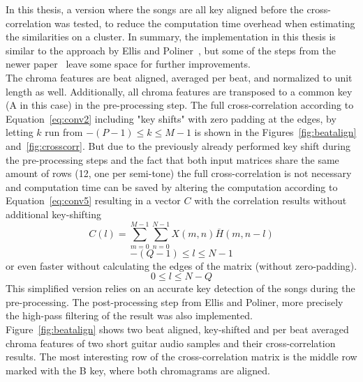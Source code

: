 In this thesis, a version where the songs are all key aligned before the cross-correlation was tested, to reduce the computation time overhead when estimating the similarities on a cluster. 
In summary, the implementation in this thesis is similar to the approach by Ellis and Poliner~\cite{chroma3}, but some of the steps from the newer paper~\cite{cover802} leave some space for further improvements.\\ The chroma features are beat aligned, averaged per beat, and normalized to unit length as well. Additionally, all chroma features are transposed to a common key (A in this case) in the pre-processing step. The full cross-correlation according to Equation~\eqref{eq:conv2} including "key shifts" with zero padding at the edges, by letting $k$ run from $-(P - 1) \leq k \leq M - 1$ is shown in the Figures~\ref{fig:beatalign} and~\ref{fig:crosscorr}. But due to the previously already performed key shift during the pre-processing steps and the fact that both input matrices share the same amount of rows (12, one per semi-tone) the full cross-correlation is not necessary and computation time can be saved by altering the computation according to Equation~\eqref{eq:conv5} resulting in a vector $C$ with the correlation results without additional key-shifting
\begin{equation} \label{eq:conv5}
C(l) = \sum_{m = 0}^{M - 1}{\sum_{n = 0}^{N - 1}{X(m, n)\overline{H}(m, n - l)}}
\end{equation}
\begin{equation} \label{eq:conv6}
-(Q - 1) \leq l \leq N - 1
\end{equation}
or even faster without calculating the edges of the matrix (without zero-padding).
\begin{equation} \label{eq:conv7}
0 \leq l \leq N - Q
\end{equation}
\noindent This simplified version relies on an accurate key detection of the songs during the pre-processing. The post-processing step from Ellis and Poliner, more precisely the high-pass filtering of the result was also implemented.\\
Figure~\ref{fig:beatalign} shows two beat aligned, key-shifted and per beat averaged chroma features of two short guitar audio samples and their cross-correlation results. The most interesting row of the cross-correlation matrix is the middle row marked with the B key, where both chromagrams are aligned. %
